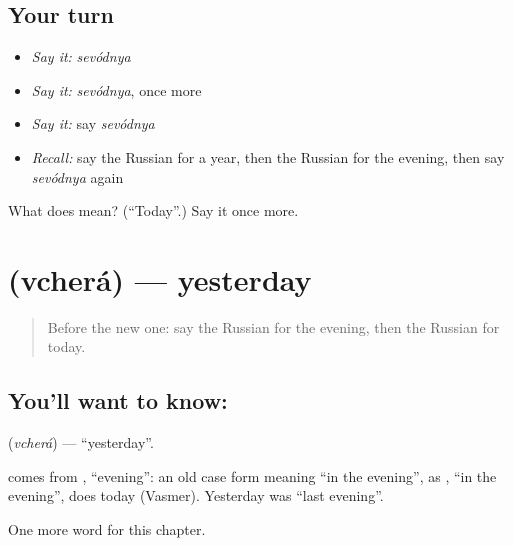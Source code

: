 \subsection*{Your turn}
\begin{itemize}
\raggedright
  \item \emph{Say it:} \emph{sevódnya}
  \item \emph{Say it:} \emph{sevódnya}, once more
  \item \emph{Say it:} say \emph{sevódnya}
  \item \emph{Recall:} say the Russian for a year, then the Russian for the evening, then say \emph{sevódnya} again
\end{itemize}

\begin{tcolorbox}[breakable,colback=teal!4,colframe=teal!35!black,title={Before you move on}]
What does  mean? (\textquotedblleft{}Today\textquotedblright{}.) Say it once more.
\end{tcolorbox}
\section[\texorpdfstring{\ru{вчера} (vcherá)}{вчера (vcherá)}]{ (vcherá) — yesterday}

\label{lesson:RU-C69-yesterday}



\begin{quote}
Before the new one: say the Russian for the evening, then the Russian for today.
\end{quote}

\subsection*{You'll want to know: }
\textbf{} (\emph{vcherá}) — \textquotedblleft{}yesterday\textquotedblright{}.

\begin{cousinweb}
\textbf{} comes from \emph{}, \textquotedblleft{}evening\textquotedblright{}: an old case form meaning \textquotedblleft{}in the evening\textquotedblright{}, as \emph{}, \textquotedblleft{}in the evening\textquotedblright{}, does today (Vasmer). Yesterday was \textquotedblleft{}last evening\textquotedblright{}.
\end{cousinweb}

\begin{grammarlens}[title={What you've built}]
One more word for this chapter.
\end{grammarlens}


